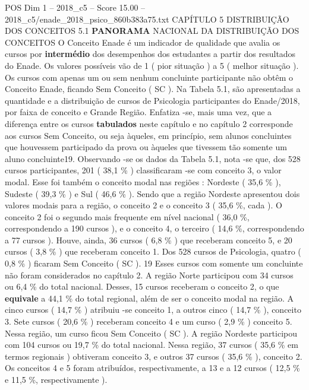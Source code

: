 \begin{textsample}{POS Dim 1 – 2018\_c5 – Score 15.00 – 2018\_c5/enade\_2018\_psico\_860b383a75.txt}  \label{ex:f1_pos_064}
CAPÍTULO 5 DISTRIBUIÇÃO DOS CONCEITOS 5.1 \textbf{PANORAMA} NACIONAL DA DISTRIBUIÇÃO DOS CONCEITOS O Conceito Enade é um indicador de qualidade que avalia os cursos por \textbf{intermédio} dos desempenhos dos estudantes a partir dos resultados do Enade.
Os valores possíveis vão de 1 ( pior situação ) a 5 ( melhor situação ).
Os cursos com apenas um ou sem nenhum concluinte participante não obtêm o Conceito Enade, ficando Sem Conceito ( SC ).
Na Tabela 5.1, são apresentadas a quantidade e a distribuição de cursos de Psicologia participantes do Enade/2018, por faixa de conceito e Grande Região.
Enfatiza -se, mais uma vez, que a diferença entre os cursos \textbf{tabulados} neste capítulo e no capítulo 2 corresponde aos cursos Sem Conceito, ou seja àqueles, em princípio, sem alunos concluintes que houvessem participado da prova ou àqueles que tivessem tão somente um aluno concluinte19.
Observando -se os dados da Tabela 5.1, nota -se que, dos 528 cursos participantes, 201 ( 38,1 \% ) classificaram -se com conceito 3, o valor modal.
Esse foi também o conceito modal nas regiões : Nordeste ( 35,6 \% ), Sudeste ( 39,3 \% ) e Sul ( 46,6 \% ).
Sendo que a região Nordeste apresentou dois valores modais para a região, o conceito 2 e o conceito 3 ( 35,6 \%, cada ).
O conceito 2 foi o segundo mais frequente em nível nacional ( 36,0 \%, correspondendo a 190 cursos ), e o conceito 4, o terceiro ( 14,6 \%, correspondendo a 77 cursos ).
Houve, ainda, 36 cursos ( 6,8 \% ) que receberam conceito 5, e 20 cursos ( 3,8 \% ) que receberam conceito 1.
Dos 528 cursos de Psicologia, quatro ( 0,8 \% ) ficaram Sem Conceito ( SC ). 19 Esses cursos com somente um concluinte não foram considerados no capítulo 2.
A região Norte participou com 34 cursos ou 6,4 \% do total nacional.
Desses, 15 cursos receberam o conceito 2, o que \textbf{equivale} a 44,1 \% do total regional, além de ser o conceito modal na região.
A cinco cursos ( 14,7 \% ) atribuiu -se conceito 1, a outros cinco ( 14,7 \% ), conceito 3.
Sete cursos ( 20,6 \% ) receberam conceito 4 e um curso ( 2,9 \% ) conceito 5.
Nessa região, um curso ficou Sem Conceito ( SC ).
A região Nordeste participou com 104 cursos ou 19,7 \% do total nacional.
Nessa região, 37 cursos ( 35,6 \% em termos regionais ) obtiveram conceito 3, e outros 37 cursos ( 35,6 \% ), conceito 2.
Os conceitos 4 e 5 foram atribuídos, respectivamente, a 13 e a 12 cursos ( 12,5 \% e 11,5 \%, respectivamente ).

\end{textsample}
